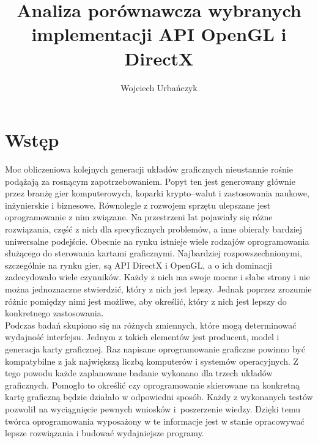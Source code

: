 \documentclass[archive]{mgr}
\title{Analiza porównawcza wybranych implementacji API OpenGL i DirectX}
\author{ Wojciech Urbańczyk}
\begin{document}


\maketitle

\tableofcontents

\listoffigures
\listoftables
\lstlistoflistings

\chapter{Wstęp}


 Moc obliczeniowa kolejnych generacji układów graficznych nieustannie rośnie podążają za rosnącym zapotrzebowaniem. Popyt ten jest generowany głównie przez branżę gier komputerowych, koparki krypto–walut i zastosowania naukowe, inżynierskie i biznesowe. Równolegle z rozwojem sprzętu ulepszane jest oprogramowanie z nim związane. Na przestrzeni lat pojawiały się różne rozwiązania, część z nich dla specyficznych problemów, a inne obierały bardziej uniwersalne podejście. Obecnie na rynku istnieje wiele rodzajów oprogramowania służącego do sterowania kartami graficznymi. Najbardziej rozpowszechnionymi, szczególnie na rynku gier, są API DirectX i OpenGL, a o ich dominacji zadecydowało wiele czynników. Każdy z nich ma swoje mocne i słabe strony i nie można jednoznaczne stwierdzić, który z nich jest lepszy. Jednak poprzez zrozumie różnic pomiędzy nimi jest możliwe, aby określić, który z nich jest lepszy do konkretnego zastosowania. \\
 
Podczas badań skupiono się na różnych zmiennych, które mogą determinować wydajność interfejsu. Jednym z takich elementów jest producent, model i generacja karty graficznej. Raz napisane oprogramowanie graficzne powinno być kompatybilne z jak największą liczbą komputerów i systemów operacyjnych. Z tego powodu każde zaplanowane badanie wykonano dla trzech układów graficznych. Pomogło to określić czy oprogramowanie skierowane na konkretną kartę graficzną będzie działało w odpowiedni sposób. Każdy z wykonanych testów pozwolił na wyciągnięcie pewnych wniosków i~poszerzenie wiedzy. Dzięki temu twórca oprogramowania wyposażony w te informacje jest w stanie opracowywać lepsze rozwiązania i budować wydajniejsze programy.\\
\end{document}
